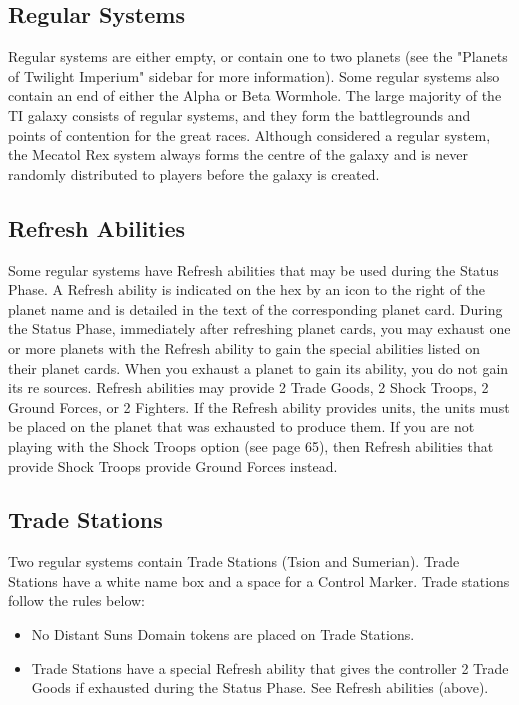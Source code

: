 \documentclass[11pt,fleqn]{book} %
\begin{document}
\subsection{Regular Systems}
Regular systems are either empty, or contain one to two planets (see the "Planets of Twilight Imperium" sidebar for more information).
Some regular systems also contain an end of either the Alpha or Beta Wormhole.
The large majority of the TI galaxy consists of regular systems, and they form the battlegrounds and points of contention for the great races.
Although considered a regular system, the Mecatol Rex system always forms the centre of the galaxy and is never randomly distributed to players before the galaxy is created.

\begin{SEbox}
	
\subsection{Refresh Abilities} 
Some regular systems have Refresh abilities that may be used during the Status Phase.
A Refresh ability is indicated on the hex by an icon to the right of the planet name and is detailed in the text of the corresponding planet card.
During the Status Phase, immediately after refreshing planet cards, you may exhaust one or more planets with the Refresh ability to gain the special abilities listed on their planet cards.
When you exhaust a planet to gain its ability, you do not gain its re sources.
Refresh abilities may provide 2 Trade Goods, 2 Shock Troops, 2 Ground Forces, or 2 Fighters.
If the Refresh ability provides units, the units must be placed on the planet that was exhausted to produce them.
If you are not playing with the Shock Troops option (see page 65), then Refresh abilities that provide Shock Troops provide Ground Forces instead.

\subsection{Trade Stations} 
Two regular systems contain Trade Stations (Tsion and Sumerian). Trade Stations have a white name box and a space for a Control Marker. Trade stations follow the rules below:
\begin{itemize}
	\item No Distant Suns Domain tokens are placed on Trade Stations.
	\item Trade Stations have a special Refresh ability that gives the controller 2 Trade Goods if exhausted during the Status Phase. See Refresh abilities (above).
	

\end{itemize}
\end{SEbox}
\end{document}
